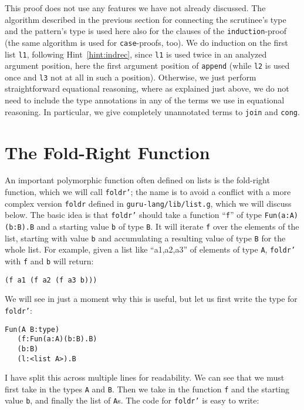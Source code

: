 \documentclass{book}[12pt]
\begin{document}
\noindent This proof does not use any features we have not already
discussed.  The algorithm described in the previous section for
connecting the scrutinee's type and the pattern's type is used here
also for the clauses of the \texttt{induction}-proof (the same
algorithm is used for \texttt{case}-proofs, too).  We do induction on
the first list \texttt{l1}, following Hint~\ref{hint:indrec}, since
\texttt{l1} is used twice in an analyzed argument position, here the
first argument position of \texttt{append} (while \texttt{l2} is used
once and \texttt{l3} not at all in such a position).  Otherwise, we
just perform straightforward equational reasoning, where as explained
just above, we do not need to include the type annotations in any of
the terms we use in equational reasoning.  In particular, we give
completely unannotated terms to \texttt{join} and \texttt{cong}.

\section{The Fold-Right Function}

An important polymorphic function often defined on lists is the
fold-right function, which we will call \texttt{foldr'}; the name is
to avoid a conflict with a more complex version \texttt{foldr} defined
in \texttt{guru-lang/lib/list.g}, which we will discuss below.  The
basic idea is that \texttt{foldr'} should take a function
``\texttt{f}'' of type \texttt{Fun(a:A)(b:B).B} and a starting value
\texttt{b} of type \texttt{B}.  It will iterate \texttt{f} over the
elements of the list, starting with value \texttt{b} and accumulating
a resulting value of type \texttt{B} for the whole list.  For example,
given a list like ``a1,a2,a3'' of elements of type \texttt{A},
\texttt{foldr'} with \texttt{f} and \texttt{b} will return:

\begin{verbatim}
(f a1 (f a2 (f a3 b)))
\end{verbatim}

\noindent We will see in just a moment why this is useful, but let
us first write the type for \texttt{foldr'}:

\begin{verbatim}
Fun(A B:type)
   (f:Fun(a:A)(b:B).B)
   (b:B)
   (l:<list A>).B 
\end{verbatim}

\noindent I have split this across multiple lines for readability.  We can
see that we must first take in the types \texttt{A} and \texttt{B}.  Then
we take in the function \texttt{f} and the starting value \texttt{b},
and finally the list of \texttt{A}s.  The code for \texttt{foldr'} is
easy to write:
\end{document}
